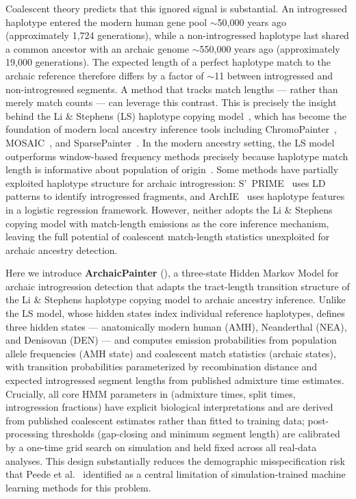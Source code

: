 Coalescent theory predicts that this ignored signal is substantial.
An introgressed haplotype entered the modern human gene pool $\sim$50,000 years ago
(approximately 1,724 generations), while a non-introgressed haplotype last shared
a common ancestor with an archaic genome $\sim$550,000 years ago
(approximately 19,000 generations).
The expected length of a perfect haplotype match to the archaic reference therefore
differs by a factor of $\sim$11 between introgressed and non-introgressed segments.
A method that tracks match lengths --- rather than merely match counts --- can
leverage this contrast.
This is precisely the insight behind the Li \& Stephens (LS) haplotype copying
model~\citep{li2003modeling}, which has become the foundation of modern local
ancestry inference tools including ChromoPainter~\citep{lawson2012inference},
MOSAIC~\citep{salter2019mosaic}, and SparsePainter~\citep{yang2025sparsepainter}.
In the modern ancestry setting, the LS model outperforms window-based frequency
methods precisely because haplotype match length is informative about population
of origin~\citep{price2009sensitive}.
Some methods have partially exploited haplotype structure for archaic
introgression: S'~PRIME~\citep{browning2018ancestry} uses LD patterns to
identify introgressed fragments, and ArchIE~\citep{durvasula2019statistical}
uses haplotype features in a logistic regression framework.
However, neither adopts the Li \& Stephens copying model with match-length
emissions as the core inference mechanism, leaving the full potential of
coalescent match-length statistics unexploited for archaic ancestry detection.

Here we introduce \textbf{ArchaicPainter} (\AP{}), a three-state Hidden Markov
Model for archaic introgression detection that adapts the tract-length
transition structure of the Li \& Stephens haplotype copying model to
archaic ancestry inference.
Unlike the LS model, whose hidden states index individual reference haplotypes,
\AP{} defines three hidden states --- anatomically modern human (AMH),
Neanderthal (NEA), and Denisovan (DEN) --- and computes emission probabilities
from population allele frequencies (AMH state) and coalescent match statistics
(archaic states), with transition probabilities parameterized by recombination
distance and expected introgressed segment lengths from published admixture
time estimates.
Crucially, all core HMM parameters in \AP{} (admixture times, split times,
introgression fractions) have explicit biological interpretations and are derived
from published coalescent estimates rather than fitted to training data;
post-processing thresholds (gap-closing and minimum segment length) are calibrated
by a one-time grid search on simulation and held fixed across all real-data analyses.
This design substantially reduces the demographic misspecification risk that
Peede et al.~\citeyear{peede2026review}
identified as a central limitation of simulation-trained machine learning methods
for this problem.


